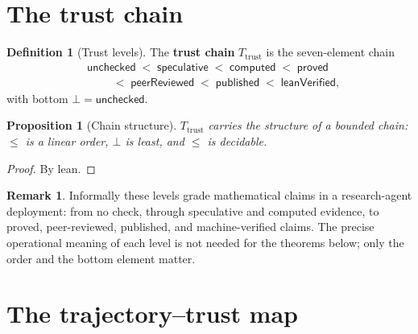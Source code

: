 \documentclass[11pt,a4paper]{article}
\theoremstyle{plain}
\newtheorem{proposition}[theorem]{Proposition}
\theoremstyle{definition}
\newtheorem{definition}[theorem]{Definition}
\newtheorem{remark}[theorem]{Remark}
\begin{document}
\section{The trust chain}

\begin{definition}[Trust levels]\label{def:trustlevel}
The \textbf{trust chain} $T_{\mathrm{trust}}$ is the seven-element chain
\begin{equation}
\begin{aligned}
  &\mathsf{unchecked}
  \;<\;
  \mathsf{speculative}
  \;<\;
  \mathsf{computed}
  \;<\;
  \mathsf{proved} \\
  &\qquad
  \;<\;
  \mathsf{peerReviewed}
  \;<\;
  \mathsf{published}
  \;<\;
  \mathsf{leanVerified},
\end{aligned}
\end{equation}
with bottom $\bot = \mathsf{unchecked}$.
\end{definition}

\begin{proposition}[Chain structure]\label{prop:trust-chain}
$T_{\mathrm{trust}}$ carries the structure of a bounded chain: $\le$ is a
linear order, $\bot$ is least, and $\le$ is decidable.
\end{proposition}

\begin{proof}
By lean.
\end{proof}

\begin{remark}
Informally these levels grade mathematical claims in a research-agent
deployment: from no check, through speculative and computed evidence, to
proved, peer-reviewed, published, and machine-verified claims. The precise
operational meaning of each level is not needed for the theorems below;
only the order and the bottom element matter.
\end{remark}

\section{The trajectory--trust map}
\end{document}
